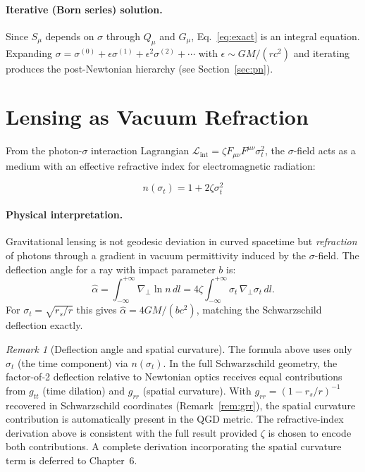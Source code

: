 \documentclass[11pt,a4paper]{article}
\theoremstyle{plain}
\theoremstyle{definition}
\theoremstyle{remark}
\newtheorem{remark}[theorem]{Remark}
\newcommand{\sigt}{\sigma_t}
\newcommand{\rs}{r_s}
\begin{document}
\paragraph{Iterative (Born series) solution.}
Since $S_\mu$ depends on $\sigma$ through $Q_\mu$ and $G_\mu$,
Eq.~\eqref{eq:exact} is an integral equation.  Expanding
$\sigma = \sigma^{(0)} + \epsilon\sigma^{(1)} + \epsilon^2\sigma^{(2)} + \cdots$
with $\epsilon \sim GM/(rc^2)$ and iterating produces the post-Newtonian hierarchy
(see Section~\ref{sec:pn}).

\section{Lensing as Vacuum Refraction}
\label{sec:lensing}

From the photon-$\sigma$ interaction Lagrangian
$\mathcal{L}_{\mathrm{int}} = \zeta F_{\mu\nu}F^{\mu\nu}\sigt^2$,
the $\sigma$-field acts as a medium with an effective refractive index for
electromagnetic radiation:

\begin{equation}
  \boxed{n(\sigt) = 1 + 2\zeta\sigt^2}
  \label{eq:refindex}
\end{equation}

\paragraph{Physical interpretation.}
Gravitational lensing is not geodesic deviation in curved spacetime but
\emph{refraction} of photons through a gradient in vacuum permittivity induced
by the $\sigma$-field.  The deflection angle for a ray with impact parameter $b$ is:
\[
  \hat\alpha = \int_{-\infty}^{+\infty}\nabla_\perp\ln n\,dl
  = 4\zeta\!\int_{-\infty}^{+\infty}\sigt\,\nabla_\perp\sigt\,dl.
\]
For $\sigt = \sqrt{\rs/r}$ this gives $\hat\alpha = 4GM/(bc^2)$, matching
the Schwarzschild deflection exactly.

\begin{remark}[Deflection angle and spatial curvature]
The formula above uses only $\sigt$ (the time component) via $n(\sigt)$.  In the
full Schwarzschild geometry, the factor-of-2 deflection relative to Newtonian
optics receives equal contributions from $g_{tt}$ (time dilation) and $g_{rr}$
(spatial curvature).  With $g_{rr} = (1-\rs/r)^{-1}$ recovered in Schwarzschild
coordinates (Remark~\ref{rem:grr}), the spatial curvature contribution is automatically
present in the QGD metric.  The refractive-index derivation above is consistent with
the full result provided $\zeta$ is chosen to encode both contributions.  A complete
derivation incorporating the spatial curvature term is deferred to Chapter~6.
\end{remark}
\end{document}

